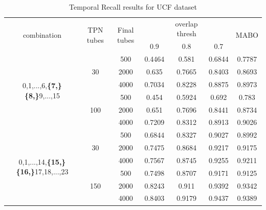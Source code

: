 \documentclass{report}
\begin{document}
\begin{table}
  \centering
  \setlength{\tabcolsep}{4pt}
  \begin{tabular}{||c | c | c ||c c c| c|}

  \hline
  \multirow{2}{*}{combination} & \multirow{2}{2.5em}{TPN tubes} & \multirow{2}{2.5em}{Final tubes} &  {} &overlap thresh & {} & \multirow{2}{*}{MABO} \\
  {} & {} & {} &  0.9 &  0.8 & 0.7 & {}\\         
  \hline
  
  
  \multirow{6}{7em}{0,1,...,6,\textbf{\{7,\}}
  \textbf{\{8,\}}9,...,15 }  & \multirow{3}{*}{30} & 500   & 0.4464  & 0.581 & 0.6844  & 0.7787 \\
  \cline{3-7}
  {} &  {}   & 2000   & 0.635  & 0.7665 & 0.8403 & 0.8693 \\
  \cline{3-7}
  {} &  {}   & 4000   & 0.7034  & 0.8228 & 0.8875 & 0.8973 \\
  \cline{2-7}
  {} &  \multirow{3}{*}{100}   & 500   & 0.454 & 0.5924 & 0.692 & 0.783 \\
  \cline{3-7}
  {} &  {}   & 2000   & 0.651 & 0.7696 & 0.8441 &0.8734 \\
  \cline{3-7}
  {} &  {}   & 4000   & 0.7209 &0.8312 & 0.8913 & 0.9026 \\

  \hline                                    
  \multirow{6}{7em}{0,1,...,14,\textbf{\{15,\}}
  \textbf{\{16,\}}17,18,...,23 }  & \multirow{3}{*}{30} & 500   & 0.6844 &0.8327 & 0.9027 & 0.8992 \\
  \cline{3-7}
                                    {} &  {}   & 2000   & 0.7475 & 0.8684 & 0.9217 & 0.9175 \\
  \cline{3-7}
                                    {} &  {}   & 4000   & 0.7567  & 0.8745  & 0.9255 & 0.9211 \\
  \cline{2-7}
                                    {} &  \multirow{3}{*}{150}   & 500   & 0.7498 &0.8707 &0.9171 & 0.9125 \\
  \cline{3-7}
                                    {} &  {}   & 2000   & 0.8243 & 0.911 & 0.9392 & 0.9342\\
  \cline{3-7}
                                    {} &  {}   & 4000   &  0.8403  & 0.9179 & 0.9437 & 0.9389\\
  \hline                                    
  \end{tabular}
  \caption{Temporal Recall results for UCF dataset}
  \label{table:ucf_temp_recall }
\end{table}
\end{document}
